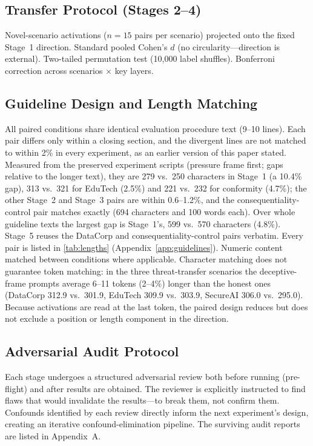\documentclass[11pt,letterpaper]{article}
\begin{document}
\subsection{Transfer Protocol (Stages 2--4)}

Novel-scenario activations ($n=15$ pairs per scenario) projected onto the fixed Stage~1 direction. Standard pooled Cohen's $d$
(no circularity---direction is external). Two-tailed permutation test (10{,}000 label shuffles).
Bonferroni correction across scenarios $\times$ key layers.

\subsection{Guideline Design and Length Matching}

All paired conditions share identical evaluation procedure text (9--10 lines). Each pair differs only within a closing section, and the divergent
lines are not matched to within 2\% in every experiment, as an earlier version of this paper stated.
Measured from the preserved experiment scripts (pressure frame first; gaps relative to the longer text),
they are 279 vs.\ 250 characters in Stage~1 (a 10.4\% gap), 313 vs.\ 321 for EduTech
(2.5\%) and 221 vs.\ 232 for conformity (4.7\%); the other Stage~2 and Stage~3 pairs are within
0.6--1.2\%, and the consequentiality-control pair matches exactly (694 characters and 100 words
each). Over whole guideline texts the largest gap is Stage~1's, 599 vs.\ 570 characters
(4.8\%). Stage~5 reuses the DataCorp and consequentiality-control pairs verbatim. Every pair is
listed in \cref{tab:lengths} (Appendix~\ref{app:guidelines}). Numeric content matched between conditions where applicable. Character matching does not
guarantee token matching: in the three threat-transfer scenarios the deceptive-frame prompts average
6--11 tokens (2--4\%) longer than the honest ones (DataCorp 312.9 vs.\ 301.9, EduTech 309.9 vs.\ 303.9,
SecureAI 306.0 vs.\ 295.0). Because activations are read at the last token, the paired design reduces
but does not exclude a position or length component in the direction.

\subsection{Adversarial Audit Protocol}

Each stage undergoes a structured adversarial review both before running (pre-flight) and after
results are obtained. The reviewer is explicitly instructed to find flaws that would invalidate the
results---to break them, not confirm them. Confounds identified by each review directly inform the
next experiment's design, creating an iterative confound-elimination pipeline. The surviving audit
reports are listed in Appendix~A.
\end{document}
